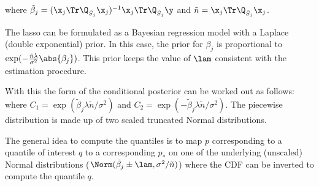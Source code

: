 \noindent where $\tilde{\beta}_j = (\x_j\Tr \Q_{\hat{S}_j} \x_j)^{-1} \x_j\Tr \Q_{\hat{S}_j} \y$ and $\tilde{n} = \x_j\Tr \Q_{\hat{S}_j} \x_j$.

The lasso can be formulated as a Bayesian regression model with a Laplace (double exponential) prior. In this case, the prior for $\beta_j$ is proportional to $\exp(-\frac{\tilde{n} \lambda} {\sigma^2} \abs{\beta_j})$. This prior keeps the value of $\lam$ consistent with the estimation procedure.

With this the form of the conditional posterior can be worked out as follows:
where $C_{1} = \exp(\tilde{\beta}_j \lambda \tilde{n}/\sigma^2)$ and $C_{2} = \exp(-\tilde{\beta}_j \lambda \tilde{n}/\sigma^2)$. The piecewise distribution is made up of two scaled truncated Normal distributions. 

The general idea to compute the quantiles is to map $p$ corresponding to a quantile of interest $q$ to a corresponding $p_*$ on one of the underlying (unscaled) Normal distributions ($\Norm(\tilde{\beta}_j \pm \lam, \sigma^2 / \tilde{n})$) where the CDF can be inverted to compute the quantile $q$.


